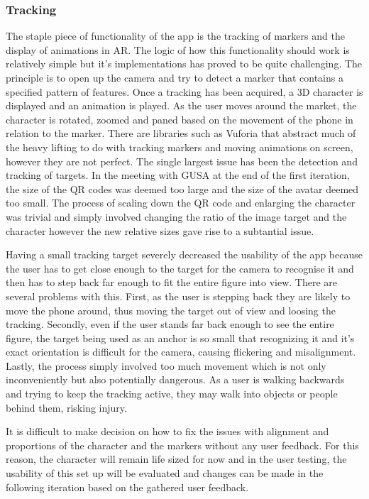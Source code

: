\documentclass{l4proj}
\begin{document}
\subsubsection{Tracking}
The staple piece of functionality of the app is the tracking of markers and the display of animations in AR. The logic of how this functionality should work is relatively simple but it's implementations has proved to be quite challenging. The principle is to open up the camera and try to detect a marker that contains a specified pattern of features. Once a tracking has been acquired, a 3D character is displayed and an animation is played. As the user moves around the market, the character is rotated, zoomed and paned based on the movement of the phone in relation to the marker. There are libraries such as Vuforia that abstract much of the heavy lifting to do with tracking markers and moving animations on screen, however they are not perfect. The single largest issue has been the detection and tracking of targets. In the meeting with GUSA at the end of the first iteration, the size of the QR codes was deemed too large and the size of the avatar deemed too small. The process of scaling down the QR code and enlarging the character was trivial and simply involved changing the ratio of the image target and the character however the new relative sizes gave rise to a subtantial issue.

Having a small tracking target severely decreased the usability of the app because the user has to get close enough to the target for the camera to recognise it and then has to step back far enough to fit the entire figure into view. There are several problems with this. First, as the user is stepping back they are likely to move the phone around, thus moving the target out of view and loosing the tracking. Secondly, even if the user stands far back enough to see the entire figure, the target being used as an anchor is so small that recognizing it and it's exact orientation is difficult for the camera, causing flickering and misalignment. Lastly, the process simply involved too much movement which is not only inconveniently but also potentially dangerous. As a user is walking backwards and trying to keep the tracking active, they may walk into objects or people behind them, risking injury. 

It is difficult to make decision on how to fix the issues with alignment and proportions of the character and the markers without any user feedback. For this reason, the character will remain life sized for now and in the user testing, the usability of this set up will be evaluated and changes can be made in the following iteration based on the gathered user feedback. 
\end{document}
